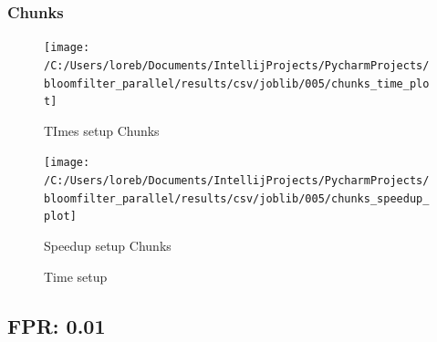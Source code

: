 \documentclass[11pt]{article}
\begin{document}
    \subsubsection{Chunks}\label{subsubsec:005-chunks}
    \begin{figure}[H]
        \centering
        \texttt{[image: /C:/Users/loreb/Documents/IntellijProjects/PycharmProjects/bloomfilter\_parallel/results/csv/joblib/005/chunks\_time\_plot]}
            \caption{TImes setup Chunks}\label{fig:005-chunks_time}
        \endminipage\hfill
        \texttt{[image: /C:/Users/loreb/Documents/IntellijProjects/PycharmProjects/bloomfilter\_parallel/results/csv/joblib/005/chunks\_speedup\_plot]}
            \caption{Speedup setup Chunks}\label{fig:005-chunks_speedup}
        \endminipage\hfill
        \caption{Time setup}
    \end{figure}

    \subsection{FPR: 0.01}\label{subsec:fpr-001}
\end{document}
